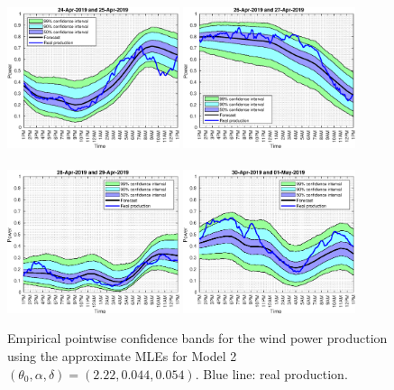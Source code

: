 \documentclass[11pt]{article}
\theoremstyle{definition}
\begin{document}
\begin{figure}[H]
\centering
\includegraphics[width=0.45\textwidth]{../../MATLAB_Files/Results/bands_testing_days/optimal_value/withDate/1.eps}
\includegraphics[width=0.45\textwidth]{../../MATLAB_Files/Results/bands_testing_days/optimal_value/withDate/2.eps}\\
\quad\\
\includegraphics[width=0.45\textwidth]{../../MATLAB_Files/Results/bands_testing_days/optimal_value/withDate/3.eps}
\includegraphics[width=0.45\textwidth]{../../MATLAB_Files/Results/bands_testing_days/optimal_value/withDate/4.eps}
\caption{Empirical pointwise confidence bands for the wind power production using the approximate MLEs for Model 2 $(\theta_0, \alpha ,\delta)=(2.22,0.044,0.054)$. Blue line: real production.}
\label{fig:confidence_bands}
\end{figure}
\end{document}
